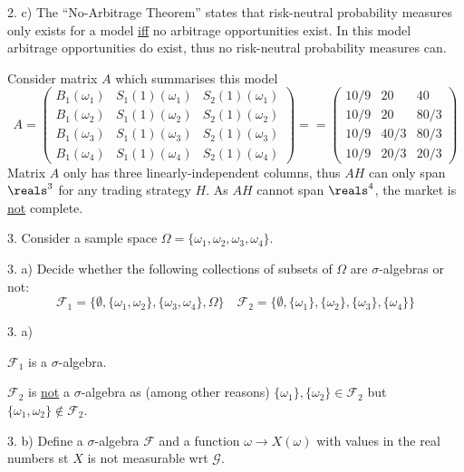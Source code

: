 \documentclass[11pt,a4paper]{article}
\begin{document}
\begin{answer}{2. c)}
  The ``No-Arbitrage Theorem'' states that risk-neutral probability measures only exists for a model \underline{iff} no arbitrage opportunities exist. In this model arbitrage opportunities do exist, thus no risk-neutral probability measures can.
  \par Consider matrix $A$ which summarises this model
  \[
  A=\begin{pmatrix}
    B_1(\omega_1)&S_1(1)(\omega_1)&S_2(1)(\omega_1)\\
    B_1(\omega_2)&S_1(1)(\omega_2)&S_2(1)(\omega_2)\\
    B_1(\omega_3)&S_1(1)(\omega_3)&S_2(1)(\omega_3)\\
    B_1(\omega_4)&S_1(1)(\omega_4)&S_2(1)(\omega_4)
  \end{pmatrix}==\begin{pmatrix}
    10/9&20&40\\
    10/9&20&80/3\\
    10/9&40/3&80/3\\
    10/9&20/3&20/3
  \end{pmatrix}
  \]
  Matrix $A$ only has three linearly-independent columns, thus $AH$ can only span $\reals^3$ for any trading strategy $H$. As $AH$ cannot span $\reals^4$, the market is \underline{not} complete.
\end{answer}

\begin{question}{3.}
  Consider a sample space $\Omega=\{\omega_1,\omega_2,\omega_3,\omega_4\}$.
\end{question}

\begin{question}{3. a)}
  Decide whether the following collections of subsets of $\Omega$ are $\sigma$-algebras or not:
  \[ \mathcal{F}_1=\big\{\emptyset,\{\omega_1,\omega_2\},\{\omega_3,\omega_4\},\Omega\big\}\quad\mathcal{F}_2=\big\{\emptyset,\{\omega_1\},\{\omega_2\},\{\omega_3\},\{\omega_4\}\big\} \]
\end{question}

\begin{answer}{3. a)}
  \par $\mathcal{F}_1$ is a $\sigma$-algebra.
  \par $\mathcal{F}_2$ is \underline{not} a $\sigma$-algebra as (among other reasons) $\{\omega_1\},\{\omega_2\}\in\mathcal{F}_2$ but $\{\omega_1,\omega_2\}\not\in\mathcal{F}_2$.
\end{answer}

\begin{question}{3. b)}
  Define a $\sigma$-algebra $\mathcal{F}$ and a function $\omega\to X(\omega)$ with values in the real numbers st $X$ is not measurable wrt $\mathcal{G}$.
\end{question}
\end{document}
